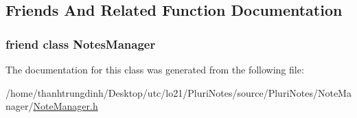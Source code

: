 \subsection{Friends And Related Function Documentation}
\subsubsection[{\texorpdfstring{Notes\+Manager}{NotesManager}}]{\setlength{\rightskip}{0pt plus 5cm}friend class {\bf Notes\+Manager}\hspace{0.3cm}{\ttfamily [friend]}}\hypertarget{classNotesManager_1_1Iterator_a017a5144e8cfa6087305055ab968ef41}{}\label{classNotesManager_1_1Iterator_a017a5144e8cfa6087305055ab968ef41}


The documentation for this class was generated from the following file\+:\begin{DoxyCompactItemize}
\item 
/home/thanhtrungdinh/\+Desktop/utc/lo21/\+Pluri\+Notes/source/\+Pluri\+Notes/\+Note\+Manager/\hyperlink{NoteManager_8h}{Note\+Manager.\+h}\end{DoxyCompactItemize}
